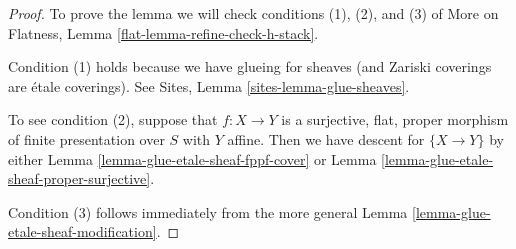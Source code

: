 \documentclass[10pt,a4paper]{amsart}
\theoremstyle{plain}
\theoremstyle{definition}
\theoremstyle{remark}
\numberwithin{equation}{subsection}
\begin{document}
\begin{proof}
To prove the lemma we will check conditions (1), (2), and (3) of
More on Flatness, Lemma \ref{flat-lemma-refine-check-h-stack}.

\medskip\noindent
Condition (1) holds because we have glueing for sheaves (and
Zariski coverings are \'etale coverings). See
Sites, Lemma \ref{sites-lemma-glue-sheaves}.

\medskip\noindent
To see condition (2), suppose that $f : X \to Y$ is a surjective,
flat, proper morphism of finite presentation over $S$ with $Y$ affine.
Then we have descent for $\{X \to Y\}$ by either
Lemma \ref{lemma-glue-etale-sheaf-fppf-cover} or
Lemma \ref{lemma-glue-etale-sheaf-proper-surjective}.

\medskip\noindent
Condition (3) follows immediately from the more general
Lemma \ref{lemma-glue-etale-sheaf-modification}.
\end{proof}
\end{document}
